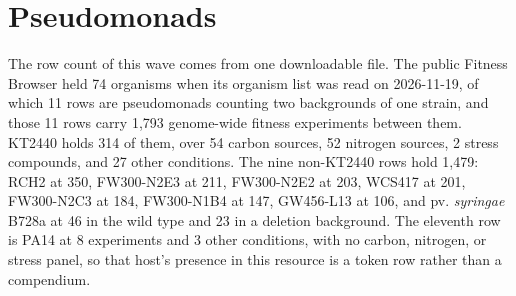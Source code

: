 
\section{Pseudomonads}\label{sec:pseudo}

The row count of this wave comes from one downloadable file. The public Fitness Browser held 74
organisms when its organism list was read on 2026-11-19, of which 11 rows are pseudomonads
counting two backgrounds of one  strain, and those 11 rows carry
1,793 genome-wide fitness experiments between them. KT2440 holds 314 of them, over 54 carbon
sources, 52 nitrogen sources, 2 stress compounds, and 27 other conditions. The nine
non-KT2440 rows hold 1,479:  RCH2 at 350,  FW300-N2E3 at 211, FW300-N2E2 at 203,  WCS417 at 201, FW300-N2C3 at
184, FW300-N1B4 at 147,  GW456-L13 at 106, and  pv.
\emph{syringae} B728a at 46 in the wild type and 23 in a  deletion background. The
eleventh row is  PA14 at 8 experiments and 3 other conditions, with
no carbon, nitrogen, or stress panel, so that host's presence in this resource is a token row
rather than a compendium.

